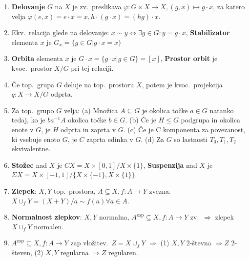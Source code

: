\documentclass[10pt,a4paper]{article}
\begin{document}
\begin{enumerate}
\item \textbf{Delovanje} $G$ na $X$ je zv.~preslikava $\varphi: G \times X
    \rightarrow X, (g, x) \mapsto g \cdot x$, za katero velja $\varphi(e, x) =
    e \cdot x = x, h \cdot (g \cdot x) = (hg) \cdot x$.
    
\item Ekv.~relacija glede na delovanje: $x \sim y \Leftrightarrow \exists g \in G:
    y = g \cdot x$,
    \quad \textbf{Stabilizator} elementa $x$ je $G_x = \{g \in G | g \cdot x = x\}$

    
\item \textbf{Orbita} elementa $x$ je $G \cdot x = \{g \cdot x | g \in G\} = [x]$, \textbf{Prostor orbit} je kvoc.~prostor $X/G$ pri tej relaciji.
    
    
\item Če top.~grupa $G$ deluje na top.~prostoru $X$, potem je kvoc.~projekcija
    $q: X \rightarrow X/G$ odprta.
    
\item Za top.~grupo $G$ velja: (a) Množica $A \subseteq G$ je okolica točke
    $a \in G$ natanko tedaj, ko je $ba^{-1}A$ okolica točke $b \in G$.
    (b) Če je $H \leq G$ podgrupa in okolica enote v $G$, je $H$ odprta in zaprta v $G$.
    (c) Če je C komponenta za povezanost, ki vsebuje enoto $G$, je $C$ zaprta edinka v $G$.
    (d) Za $G$ so lastnosti $T_0, T_1, T_2$ ekvivalentne.
    
\item \textbf{Stožec} nad $X$ je $CX = X \times [0, 1]/X \times \{1\}$, \textbf{Suspenzija} nad $X$ je $\Sigma  X = X \times [-1, 1]/
    \{X \times \{-1\}, X \times \{1\}\}$.
    
\item \textbf{Zlepek}: $X, Y$ top.~prostora, $A \subseteq X, f: A \rightarrow Y$
    zvezna.~$X \cup_f Y = (X + Y)/a \sim f(a) \forall a \in A$.
    
\item \textbf{Normalnost zlepkov}: $X, Y$ normalna, $A^{\text{zap}} \subseteq X, f:
    A \rightarrow Y$ zv.~$\Rightarrow$ zlepek $X \cup_f Y$ normalen.
    
\item $A^{\text{zap}} \subseteq X, f: A \rightarrow Y$ zap vložitev.~$Z = X \cup_f Y$
    $\Rightarrow$ (1) $X, Y$ 2-števna $\Rightarrow Z$ 2-števen,
    (2) $X, Y$ regularna $\Rightarrow Z$ regularen.
    

\end{enumerate}
\end{document}
